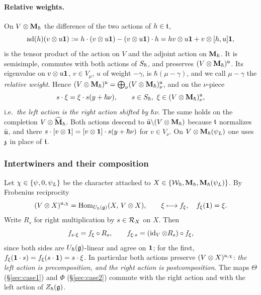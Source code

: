 \documentclass{article}
\theoremstyle{plain}
\theoremstyle{definition}
\theoremstyle{remark}
\numberwithin{equation}{section}
\begin{document}
\paragraph{Relative weights.}
On $V\otimes\mathbf{M}_\hbar$ the difference of the two actions of $h\in\mathfrak{t}$,
\[
\operatorname{ad}(h)(v\otimes u\mathbf 1):=h\cdot(v\otimes u\mathbf 1)-(v\otimes u\mathbf 1)\cdot h=hv\otimes u\mathbf 1+v\otimes[h,u]\mathbf 1 ,
\]
is the tensor product of the action on $V$ and the adjoint action on $\mathbf{M}_\hbar$. It is semisimple, commutes with both actions of $S_\hbar$, and preserves $(V\otimes\mathbf{M}_\hbar)^{\mathfrak{u}}$. Its eigenvalue on $v\otimes u\mathbf 1$, $v\in V_\mu$, $u$ of weight $-\gamma$, is $\hbar(\mu-\gamma)$, and we call $\mu-\gamma$ the \emph{relative weight}. Hence $(V\otimes\mathbf{M}_\hbar)^{\mathfrak{u}}=\bigoplus_\nu(V\otimes\mathbf{M}_\hbar)^{\mathfrak{u}}_\nu$, and on the $\nu$-piece
\begin{equation}\label{eq:left-right}
s\cdot\xi=\xi\cdot s(y+\hbar\nu),\qquad s\in\Sh,\ \xi\in(V\otimes\bM_\hbar)^{\fraku}_\nu ,
\end{equation}
i.e.\ \emph{the left action is the right action shifted by $\hbar\nu$}. The same holds on the completion $V\otimes\widehat{\mathbf{M}}_\hbar$. Both actions descend to $\bar{\mathfrak{u}}\backslash(V\otimes\mathbf{M}_\hbar)$ because $\mathfrak{t}$ normalizes $\bar{\mathfrak{u}}$, and there $s\cdot[v\otimes\mathbf 1]=[v\otimes\mathbf 1]\cdot s(y+\hbar\nu)$ for $v\in V_\nu$. On $V\otimes\mathbf{M}_\hbar(\psi_L)$ one uses $\mathfrak{z}$ in place of $\mathfrak{t}$.

\subsubsection{Intertwiners and their composition}\label{sec:intertwiners}
Let $\chi\in\{\psi,0,\psi_L\}$ be the character attached to $X\in\{\mathcal{W}_\hbar,\mathbf{M}_\hbar,\mathbf{M}_\hbar(\psi_L)\}$. By Frobenius reciprocity
\begin{equation}\label{eq:frobenius}
(V\otimes X)^{\mathfrak{u},\chi}=\operatorname{Hom}_{U_\hbar(\mathfrak{g})}(X,\,V\otimes X),\qquad\xi\longmapsto f_\xi,\quad f_\xi(\mathbf 1)=\xi .
\end{equation}
Write $R_s$ for right multiplication by $s\in\mathcal R_X$ on $X$. Then
\begin{equation}\label{eq:pre-post}
f_{s\cdot\xi}=f_\xi\circ R_s,\qquad f_{\xi\cdot s}=(\operatorname{id}_V\otimes R_s)\circ f_\xi ,
\end{equation}
since both sides are $U_\hbar(\mathfrak{g})$-linear and agree on $\mathbf 1$; for the first, $f_\xi(\mathbf 1\cdot s)=f_\xi(s\cdot\mathbf 1)=s\cdot\xi$. In particular both actions preserve $(V\otimes X)^{\mathfrak{u},\chi}$: \emph{the left action is precomposition, and the right action is postcomposition}. The maps $\Theta$ (\S\ref{sec:case1}) and $\Phi$ (\S\ref{sec:case2}) commute with the right action and with the left action of $Z_\hbar(\mathfrak{g})$.
\end{document}
